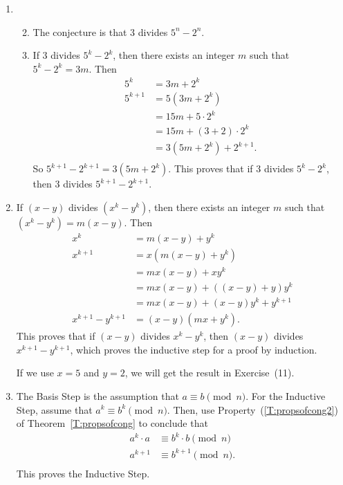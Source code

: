 \begin{enumerate}
\item \begin{enumerate} \setcounter{enumii}{1}
\item The conjecture is that 3 divides $5^n - 2^n$.

\item If 3 divides $5^k - 2^k$, then there exists an integer $m$ such that \\
$5^k - 2^k = 3m$.  Then
\[
\begin{aligned}
5^k &= 3m + 2^k \\
5^{k+1}  &= 5 \left( 3m + 2^k \right) \\
         &= 15m + 5 \cdot 2^k \\
         &= 15m + \left( 3 + 2 \right) \cdot 2^k \\
         &= 3 \left( 5m + 2^k \right) + 2^{k+1}. \\
\end{aligned}
\]
So $5^{k+1} - 2^{k+1} = 3 \left( 5m + 2^k \right)$.  This proves that if 3 divides $5^k - 2^k$, then 3 divides $5^{k+1} - 2^{k+1}$.
\end{enumerate}


\item If $(x - y)$ divides $\left( x^k - y^k \right)$, then there exists an integer $m$ such that \\
$\left( x^k - y^k \right) = m(x - y)$.  Then
\[
\begin{aligned}
x^k &= m(x - y) + y^k \\
x^{k+1}  &=  x\left( m(x - y) + y^k \right) \\
         &= mx(x - y) + xy^k \\
         &= mx(x - y) + \left( (x - y) + y \right)y^k \\
         &= mx(x - y) + (x - y)y^k + y^{k+1} \\
x^{k+1} - y^{k+1} &= (x - y)\left( mx + y^k \right).
\end{aligned}
\]
This proves that if $(x - y)$ divides $x^k - y^k$, then $(x - y)$ divides 
$x^{k+1} - y^{k+1}$, which proves the inductive step for a proof by induction.

If we use $x = 5$ and $y = 2$, we will get the result in Exercise~(11).



\item The Basis Step is the assumption that   $a \equiv b \pmod n$.  For the Inductive Step, assume that $a^k \equiv b^k \pmod n$.  Then, use Property~(\ref{T:propsofcong2}) of Theorem~\ref{T:propsofcong} to conclude that
\[
\begin{aligned}
a^k \cdot a &\equiv b^k \cdot b \pmod n \\
a^{k+1} &\equiv b^{k+1} \pmod n. \\
\end{aligned}
\]
This proves the Inductive Step.




\end{enumerate}
